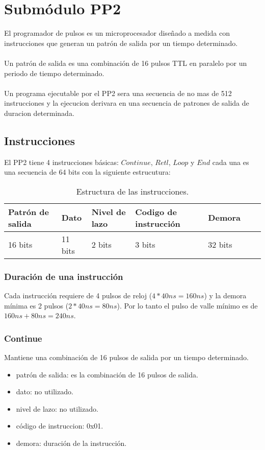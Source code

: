\section{Subm\'odulo PP2}

El programador de pulsos es un microprocesador dise\~nado a medida con instrucciones que generan
un patr\'on de salida por un tiempo determinado.
\\\\
Un patr\'on de salida es una combinaci\'on de 16 pulsos TTL en paralelo por un periodo 
de tiempo determinado.
\\\\
Un programa ejecutable por el PP2 sera una secuencia de no mas de 512 instrucciones 
y la ejecucion derivara en una secuencia de patrones de salida de duracion determinada.


\subsection{Instrucciones}

El PP2 tiene 4 instrucciones b\'asicas: $Continue$, $Retl$, $Loop$ y $End$ 
cada una es una secuencia de 64 bits con la siguiente estrucutura:\\
\begin{table}[ht]
    \centering
    \begin{tabular}{|l|l|l|l|l|l|l|}
    \hline
    Patr\'on de salida  & Dato & Nivel de lazo & Codigo de instrucci\'on & Demora \\
    \hline
    16 bits & 11 bits & 2 bits & 3 bits & 32 bits\\
    \hline
\end{tabular}
\caption{\label{tab:pp2_ins}Estructura de las instrucciones.}
\end{table}


\subsubsection{Duraci\'on de una instrucci\'on}
Cada instrucci\'on requiere de 4 pulsos de reloj ($4 * 40ns = 160ns$) 
y la demora m\'inima es 2 pulsos ($2 * 40ns = 80ns$). Por lo tanto el pulso de
valle m\'inimo es de $160ns + 80ns = 240ns$.

\subsubsection{Continue}
Mantiene una combinaci\'on de 16 pulsos de salida por un tiempo determinado.
\begin{itemize}
    \item patr\'on de salida: es la combinaci\'on de 16 pulsos de salida.
    \item dato: no utilizado.
    \item nivel de lazo: no utilizado.
    \item c\'odigo de instruccion: 0x01.
    \item demora: duraci\'on de la instrucci\'on.
\end{itemize}

